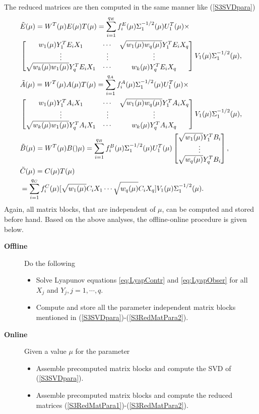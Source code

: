 The reduced matrices are then computed in the same manner like (\ref{S3SVDpara})
\begin{align}\notag
&\tilde{E}(\mu) = W^T(\mu)E(\mu)T(\mu)= \sum\limits_{i=1}^{q_E}f_i^E(\mu)\Sigma_1^{-1/2}(\mu)U_1^T(\mu)\times\\ \label{S3RedMatPara1}
&\begin{bmatrix}
w_1(\mu)Y^{T}_{1}E_iX_{1} &\cdots & \sqrt{w_1(\mu)w_q(\mu)}Y^{T}_{1}E_iX_{q}\\
\vdots & \vdots & \vdots \\
\sqrt{w_k(\mu)w_1(\mu)}Y^{T}_{q}E_iX_{1} & \cdots & 
w_k(\mu)Y^{T}_{q}E_iX_{q}
\end{bmatrix}V_1(\mu) \Sigma_1^{-1/2}(\mu),\\ \notag
&\tilde{A}(\mu) = W^T(\mu)A(\mu)T(\mu)= \sum\limits_{i=1}^{q_A}f_i^A(\mu)\Sigma_1^{-1/2}(\mu)U_1^T(\mu)\times\\
&\begin{bmatrix}
w_1(\mu)Y^{T}_{1}A_iX_{1} &\cdots & \sqrt{w_1(\mu)w_q(\mu)}Y^{T}_{1}A_iX_{q}\\
\vdots & \vdots & \vdots \\
\sqrt{w_k(\mu)w_1(\mu)}Y^{T}_{q}A_iX_{1} & \cdots & 
w_k(\mu)Y^{T}_{q}A_iX_{q}
\end{bmatrix}V_1(\mu) \Sigma_1^{-1/2}(\mu),\\ 
&\tilde{B}(\mu) = W^T(\mu)B()\mu)= \sum\limits_{i=1}^{q_B}f_i^B(\mu)\Sigma_1^{-1/2}(\mu)U_1^T(\mu)
\begin{bmatrix}
\sqrt{w_1(\mu)}Y^{T}_{1}B_i\\
\vdots \\
\sqrt{w_q(\mu)}Y^{T}_{q}B_i 
\end{bmatrix},\\
&\tilde{C}(\mu) = C(\mu)T(\mu) \notag \\
&= \sum\limits_{i=1}^{q_C}f_i^C(\mu)[
\sqrt{w_1(\mu)}C_iX_{1} \cdots  \sqrt{w_q(\mu)}C_iX_{q}]V_1(\mu)\Sigma_1^{-1/2}(\mu).\label{S3RedMatPara2}
\end{align}
Again, all matrix blocks, that are independent of $\mu$, can be computed and stored before hand. Based on the above analyses, the offline-online procedure is given below.
\begin{description}
	\item[\textbf{Offline}]Do the following
	\begin{itemize}
		\item Solve Lyapunov equations \eqref{eq:LyapContr} and \eqref{eq:LyapObser} for all $X_{j}$ and $Y_{j}, j = 1,\cdots,q$.
		\item Compute and store all the parameter independent matrix blocks mentioned in (\ref{S3SVDpara})-(\ref{S3RedMatPara2}).
	\end{itemize}
	\item[\textbf{Online}] Given a value $\mu$ for the parameter
	\begin{itemize}
		\item Assemble precomputed matrix blocks and compute the SVD of (\ref{S3SVDpara}).
		\item Assemble precomputed matrix blocks and compute the reduced matrices (\ref{S3RedMatPara1})-(\ref{S3RedMatPara2}). 
	\end{itemize}
\end{description}
